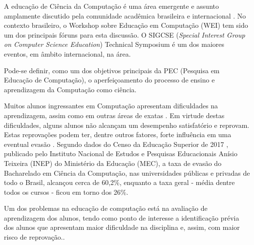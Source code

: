 \documentclass[
	12pt,				%
	openright,			%
	oneside,
	a4paper,			%
	english,			%
	french,				%
	spanish,			%
	brazil,				%
	]{abntex2}
\begin{document}




A educação de Ciência da Computação é uma área emergente e assunto amplamente discutido pela comunidade acadêmica brasileira e internacional \cite{fincher2005mapping}. No contexto brasileiro, o Workshop sobre Educação em Computação (WEI) tem sido um dos principais fóruns para esta discussão. O SIGCSE (\textit{Special Interest Group on Computer Science Education}) Technical Symposium é um dos maiores eventos, em âmbito internacional, na área. 

Pode-se definir, como um dos objetivos principais da PEC (Pesquisa em Educação de Computação), o aperfeiçoamento do processo de ensino e aprendizagem da Computação como ciência. \cite{holmboe2001research}

Muitos alunos ingressantes em Computação apresentam dificuldades na aprendizagem, assim como em outras áreas de exatas \cite{blando2015dificuldades}. Em virtude destas dificuldades, alguns alunos não alcançam um desempenho satisfatório e reprovam. Estas reprovações podem ter, dentre outros fatores, forte influência em uma eventual evasão \cite{evasaoMatheus2014}. Segundo dados do Censo da Educação Superior de 2017 \cite{Inep2017}, publicado pelo Instituto Nacional de Estudos e Pesquisas Educacionais Anísio Teixeira (INEP) do Ministério da Educação (MEC), a taxa de evasão do Bacharelado em Ciência da Computação, nas universidades públicas e privadas de todo o Brasil, alcançou cerca de 60,2\%, enquanto a taxa geral - média dentre todos os cursos - ficou em torno dos 26\%.

Um dos problemas na educação de computação está na avaliação de aprendizagem dos alunos, tendo como ponto de interesse
a identificação prévia dos alunos que apresentam maior dificuldade na disciplina e, assim, com maior risco de reprovação.\cite{martins2012assistente}. %
\end{document}
